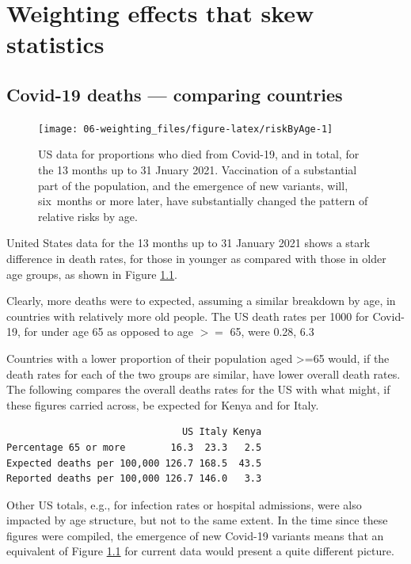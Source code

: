 \documentclass[
  10pt,
  b5paper]{book}
\begin{document}
\hypertarget{sec:yule1}{%
\chapter{Weighting effects that skew statistics}\label{sec:yule1}}

\hypertarget{covid-19-deaths-comparing-countries}{%
\section{Covid-19 deaths --- comparing countries}\label{covid-19-deaths-comparing-countries}}

\begin{figure}[H]

{\centering \texttt{[image: 06-weighting\_files/figure-latex/riskByAge-1]} 

}

\caption{US data for proportions who died from Covid-19, and in total,
for the 13 months up to 31 Jnuary 2021. Vaccination of a substantial 
part of the population, and the emergence of new variants, will,
six months or more later, have substantially changed the pattern
of relative risks by age.}\label{fig:riskByAge}
\end{figure}

United States data for the 13 months up to 31 January 2021 shows
a stark difference in death rates, for those in younger as
compared with those in older age groups, as shown in Figure
\ref{fig:riskByAge}.

Clearly, more deaths were to expected, assuming a similar
breakdown by age, in countries with relatively more old people. The US
death rates per 1000 for Covid-19, for under age 65 as opposed to age \(>=\) 65, were 0.28, 6.3

Countries with a lower proportion of their population aged \textgreater=65
would, if the death rates for each of the two groups are similar,
have lower overall death rates. The following compares the
overall deaths rates for the US with what might, if these figures
carried across, be expected for Kenya and for Italy.

\begin{verbatim}
                               US Italy Kenya
Percentage 65 or more        16.3  23.3   2.5
Expected deaths per 100,000 126.7 168.5  43.5
Reported deaths per 100,000 126.7 146.0   3.3
\end{verbatim}

Other US totals, e.g., for infection rates or hospital admissions,
were also impacted by age structure, but not to the same extent.
In the time since these figures were compiled, the emergence
of new Covid-19 variants means that an equivalent of Figure
\ref{fig:riskByAge} for current data would present a quite
different picture.
\end{document}
